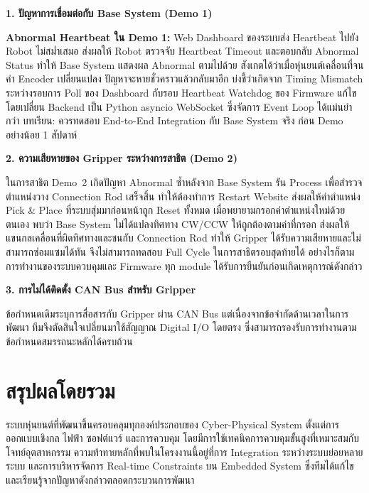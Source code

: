 \noindent\textbf{1. ปัญหาการเชื่อมต่อกับ Base System (Demo 1)}

\noindent\textbf{Abnormal Heartbeat ใน Demo 1:}
Web Dashboard ของระบบส่ง Heartbeat ไปยัง Robot ไม่สม่ำเสมอ
ส่งผลให้ Robot ตรวจจับ Heartbeat Timeout และตอบกลับ Abnormal Status
ทำให้ Base System แสดงผล Abnormal ตามไปด้วย
สังเกตได้ว่าเมื่อหุ่นยนต์เคลื่อนที่จนค่า Encoder เปลี่ยนแปลง
ปัญหาจะหายชั่วคราวแล้วกลับมาอีก
บ่งชี้ว่าเกิดจาก Timing Mismatch ระหว่างรอบการ Poll ของ Dashboard
กับรอบ Heartbeat Watchdog ของ Firmware
แก้ไขโดยเปลี่ยน Backend เป็น Python asyncio WebSocket
ซึ่งจัดการ Event Loop ได้แม่นยำกว่า
บทเรียน: ควรทดสอบ End-to-End Integration กับ Base System จริง
ก่อน Demo อย่างน้อย 1 สัปดาห์

\medskip
\noindent\textbf{2. ความเสียหายของ Gripper ระหว่างการสาธิต (Demo 2)}

\noindent
ในการสาธิต Demo~2 เกิดปัญหา Abnormal ซ้ำหลังจาก Base System
รัน Process เพื่อสำรวจตำแหน่งวาง Connection Rod เสร็จสิ้น
ทำให้ต้องทำการ Restart Website ส่งผลให้ค่าตำแหน่ง Pick \& Place
ที่ระบบสุ่มมาก่อนหน้าถูก Reset ทั้งหมด
เมื่อพยายามกรอกค่าตำแหน่งใหม่ด้วยตนเอง
พบว่า Base System ไม่ได้แปลงทิศทาง CW/CCW ให้ถูกต้องตามค่าที่กรอก
ส่งผลให้แขนกลเคลื่อนที่ผิดทิศทางและชนกับ Connection Rod
ทำให้ Gripper ได้รับความเสียหายและไม่สามารถซ่อมแซมได้ทัน
จึงไม่สามารถทดสอบ Full Cycle ในการสาธิตรอบสุดท้ายได้
อย่างไรก็ตาม การทำงานของระบบควบคุมและ Firmware ทุก module
ได้รับการยืนยันก่อนเกิดเหตุการณ์ดังกล่าว

\medskip
\noindent\textbf{3. การไม่ได้ติดตั้ง CAN Bus สำหรับ Gripper}

\noindent
ข้อกำหนดเดิมระบุการสื่อสารกับ Gripper ผ่าน CAN Bus
แต่เนื่องจากข้อจำกัดด้านเวลาในการพัฒนา
ทีมจึงตัดสินใจเปลี่ยนมาใช้สัญญาณ Digital I/O โดยตรง
ซึ่งสามารถรองรับการทำงานตามข้อกำหนดสมรรถนะหลักได้ครบถ้วน

\section*{สรุปผลโดยรวม}

ระบบหุ่นยนต์ที่พัฒนาขึ้นครอบคลุมทุกองค์ประกอบของ Cyber-Physical System
ตั้งแต่การออกแบบเชิงกล ไฟฟ้า ซอฟต์แวร์ และการควบคุม
โดยมีการใช้เทคนิคการควบคุมขั้นสูงที่เหมาะสมกับโจทย์อุตสาหกรรม
ความท้าทายหลักที่พบในโครงงานนี้อยู่ที่การ Integration ระหว่างระบบย่อยหลายระบบ
และการบริหารจัดการ Real-time Constraints บน Embedded System
ซึ่งทีมได้แก้ไขและเรียนรู้จากปัญหาดังกล่าวตลอดกระบวนการพัฒนา